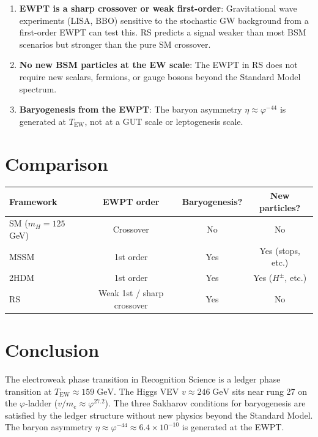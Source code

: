 \documentclass[12pt,a4paper]{article}
\theoremstyle{definition}
\theoremstyle{remark}
\begin{document}
\begin{enumerate}
  \item \textbf{EWPT is a sharp crossover or weak first-order}:
  Gravitational wave experiments (LISA, BBO) sensitive to the
  stochastic GW background from a first-order EWPT can test this.
  RS predicts a signal weaker than most BSM scenarios but stronger
  than the pure SM crossover.

  \item \textbf{No new BSM particles at the EW scale}: The EWPT in
  RS does not require new scalars, fermions, or gauge bosons beyond
  the Standard Model spectrum.

  \item \textbf{Baryogenesis from the EWPT}: The baryon asymmetry
  $\eta \approx \varphi^{-44}$ is generated at $T_{\mathrm{EW}}$,
  not at a GUT scale or leptogenesis scale.
\end{enumerate}

\section{Comparison}
\label{sec:comparison}

\begin{center}
\renewcommand{\arraystretch}{1.3}
\begin{tabular}{@{}lccc@{}}
\toprule
\textbf{Framework} & \textbf{EWPT order} &
\textbf{Baryogenesis?} & \textbf{New particles?} \\
\midrule
SM ($m_H = 125$ GeV) & Crossover & No & No \\
MSSM & 1st order & Yes & Yes (stops, etc.) \\
2HDM & 1st order & Yes & Yes ($H^\pm$, etc.) \\
RS & Weak 1st / sharp crossover & Yes & No \\
\bottomrule
\end{tabular}
\end{center}

\section{Conclusion}
\label{sec:conclusion}

The electroweak phase transition in Recognition Science is a ledger
phase transition at $T_{\mathrm{EW}} \approx 159\;\mathrm{GeV}$.
The Higgs VEV $v \approx 246\;\mathrm{GeV}$ sits near rung 27 on
the $\varphi$-ladder ($v/m_e \approx \varphi^{27.2}$).  The three
Sakharov conditions for baryogenesis are satisfied by the ledger
structure without new physics beyond the Standard Model.  The
baryon asymmetry $\eta \approx \varphi^{-44} \approx
6.4 \times 10^{-10}$ is generated at the EWPT.
\end{document}
